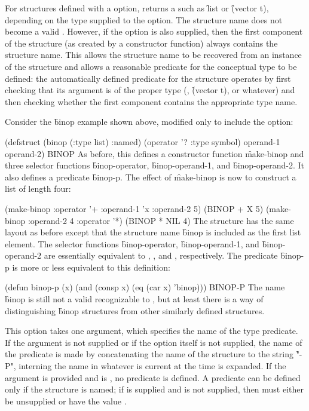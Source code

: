 For structures defined with a  option,  
returns a  such as \f{list} or \f{(vector t)},
depending on the type supplied to the  option.
The structure name does not become a valid .
However,
if the  option is also supplied, then the first component
of the structure (as created by a  constructor function)
always contains the structure name.  This allows the structure name
to be recovered from an instance of the structure and allows a reasonable
predicate for the conceptual type to be defined:
the automatically defined
 predicate for the structure operates by first
checking that its argument is of the proper type (, 
\f{(vector t)},
or whatever) and then checking whether the first component contains
the appropriate type name.

Consider the \f{binop} example shown above, modified only to
include the  option:

\code
 (defstruct (binop (:type list) :named)
   (operator '? :type symbol)
   operand-1
   operand-2) \EV BINOP
\endcode
As before, this defines a constructor function \f{make-binop} and three
selector functions \f{binop-operator}, \f{binop-operand-1},
and \f{binop-operand-2}.  It also defines a predicate \f{binop-p}.
The effect of \f{make-binop} is now to construct a list of length four:

\code
 (make-binop :operator '+ :operand-1 'x :operand-2 5) \EV (BINOP + X 5)
 (make-binop :operand-2 4 :operator '*) \EV (BINOP * NIL 4)
\endcode
The structure has the same layout as before except that the structure name
\f{binop} is included as the first list element.
The selector functions
\f{binop-operator}, \f{binop-operand-1},
and \f{binop-operand-2} are essentially equivalent to ,
, and , respectively.
The predicate \f{binop-p} is more or less equivalent to this
definition:

\code
 (defun binop-p (x)
   (and (consp x) (eq (car x) 'binop))) \EV BINOP-P
\endcode
The name \f{binop} is still not a valid  recognizable
to , but at least there is a way of distinguishing \f{binop}
structures from other similarly defined structures.



This option takes one argument, which specifies the name of the type predicate.
If the argument is not supplied or if the option itself is not
supplied, the name of the predicate is made by concatenating the
name of the structure to the string \f{"-P"}, interning the name
in whatever  is current at the time 
is expanded.
If the argument is provided and is \nil, no predicate is defined.
A predicate can be defined only if the structure is named;
if  is supplied and  is not supplied,
then  must either be unsupplied or have the value \nil.

